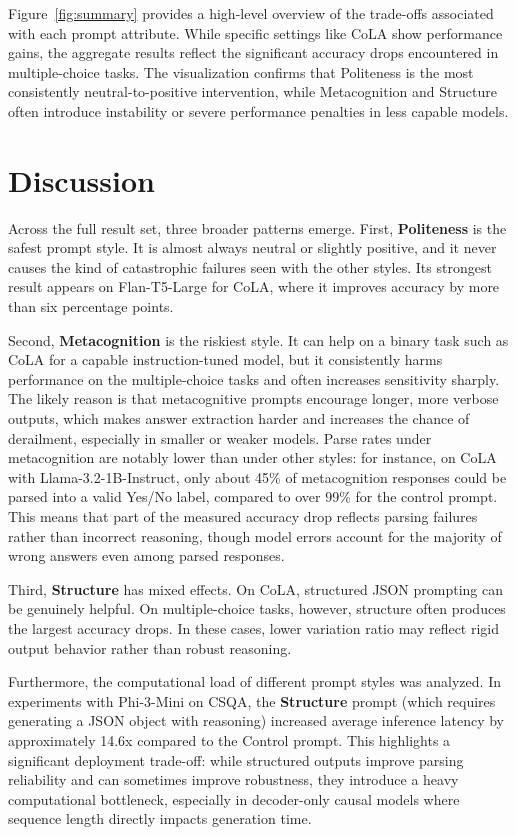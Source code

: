 \documentclass[11pt]{article}
\begin{document}
Figure~\ref{fig:summary} provides a high-level overview of the trade-offs associated with each prompt attribute. While specific settings like CoLA show performance gains, the aggregate results reflect the significant accuracy drops encountered in multiple-choice tasks. The visualization confirms that Politeness is the most consistently neutral-to-positive intervention, while Metacognition and Structure often introduce instability or severe performance penalties in less capable models.

\section{Discussion}

Across the full result set, three broader patterns emerge. First, \textbf{Politeness} is the safest prompt style. It is almost always neutral or slightly positive, and it never causes the kind of catastrophic failures seen with the other styles. Its strongest result appears on Flan-T5-Large for CoLA, where it improves accuracy by more than six percentage points.

Second, \textbf{Metacognition} is the riskiest style. It can help on a binary task such as CoLA for a capable instruction-tuned model, but it consistently harms performance on the multiple-choice tasks and often increases sensitivity sharply. The likely reason is that metacognitive prompts encourage longer, more verbose outputs, which makes answer extraction harder and increases the chance of derailment, especially in smaller or weaker models. Parse rates under metacognition are notably lower than under other styles: for instance, on CoLA with Llama-3.2-1B-Instruct, only about 45\% of metacognition responses could be parsed into a valid Yes/No label, compared to over 99\% for the control prompt. This means that part of the measured accuracy drop reflects parsing failures rather than incorrect reasoning, though model errors account for the majority of wrong answers even among parsed responses.

Third, \textbf{Structure} has mixed effects. On CoLA, structured JSON prompting can be genuinely helpful. On multiple-choice tasks, however, structure often produces the largest accuracy drops. In these cases, lower variation ratio may reflect rigid output behavior rather than robust reasoning.

Furthermore, the computational load of different prompt styles was analyzed. In experiments with Phi-3-Mini on CSQA, the \textbf{Structure} prompt (which requires generating a JSON object with reasoning) increased average inference latency by approximately 14.6x compared to the Control prompt. This highlights a significant deployment trade-off: while structured outputs improve parsing reliability and can sometimes improve robustness, they introduce a heavy computational bottleneck, especially in decoder-only causal models where sequence length directly impacts generation time.
\end{document}
